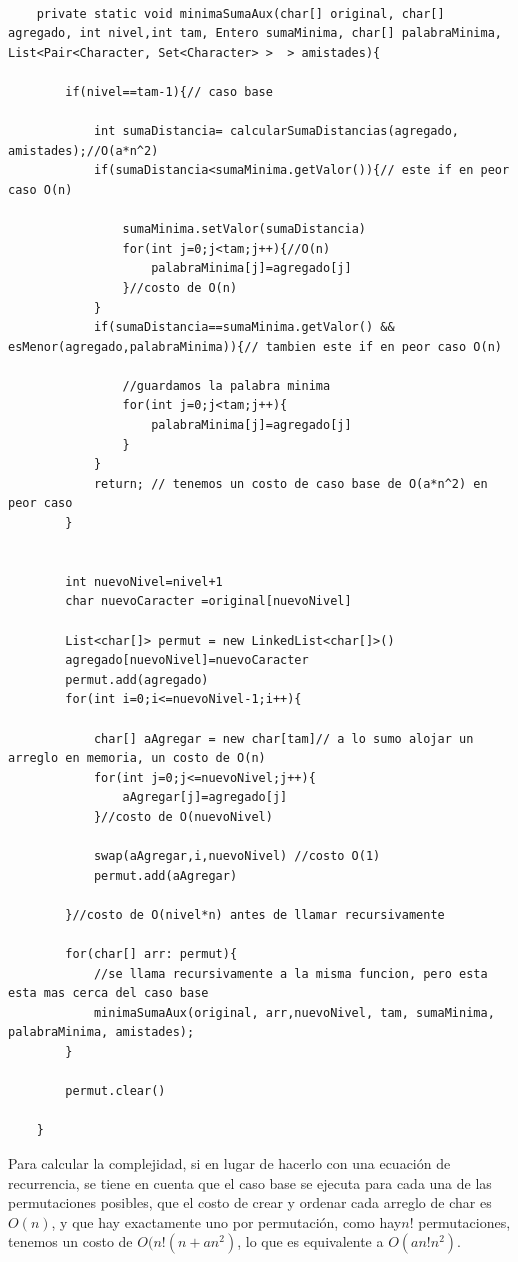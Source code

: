 \begin{lstlisting}

	private static void minimaSumaAux(char[] original, char[] agregado, int nivel,int tam, Entero sumaMinima, char[] palabraMinima, List<Pair<Character, Set<Character> >  > amistades){
		
		if(nivel==tam-1){// caso base
						
			int sumaDistancia= calcularSumaDistancias(agregado, amistades);//O(a*n^2)
			if(sumaDistancia<sumaMinima.getValor()){// este if en peor caso O(n)
				
				sumaMinima.setValor(sumaDistancia)	
				for(int j=0;j<tam;j++){//O(n)
					palabraMinima[j]=agregado[j]
				}//costo de O(n)		
			}	
			if(sumaDistancia==sumaMinima.getValor() && esMenor(agregado,palabraMinima)){// tambien este if en peor caso O(n)
				
				//guardamos la palabra minima
				for(int j=0;j<tam;j++){
					palabraMinima[j]=agregado[j]
				}
			}
			return; // tenemos un costo de caso base de O(a*n^2) en peor caso
		}
		
		
		int nuevoNivel=nivel+1
		char nuevoCaracter =original[nuevoNivel]

		List<char[]> permut = new LinkedList<char[]>()
		agregado[nuevoNivel]=nuevoCaracter
		permut.add(agregado)
		for(int i=0;i<=nuevoNivel-1;i++){
			
			char[] aAgregar = new char[tam]// a lo sumo alojar un arreglo en memoria, un costo de O(n)
			for(int j=0;j<=nuevoNivel;j++){	
				aAgregar[j]=agregado[j]		
			}//costo de O(nuevoNivel)
			
			swap(aAgregar,i,nuevoNivel)	//costo O(1)
			permut.add(aAgregar)
			
		}//costo de O(nivel*n) antes de llamar recursivamente

		for(char[] arr: permut){
			//se llama recursivamente a la misma funcion, pero esta esta mas cerca del caso base
			minimaSumaAux(original, arr,nuevoNivel, tam, sumaMinima, palabraMinima, amistades);		
		}
		
		permut.clear()
		
	}
\end{lstlisting}


Para calcular la complejidad, si en lugar de hacerlo con una ecuación de recurrencia, se tiene en cuenta que el caso base se ejecuta para cada una de las permutaciones posibles, que el costo de crear y ordenar cada arreglo de char es $ O(n) $, y que hay exactamente uno por permutación, como hay$ n! $ permutaciones, tenemos un costo de $ O(n!(n+an^2)$, lo que es equivalente a $ O(an!n^2)$. 

